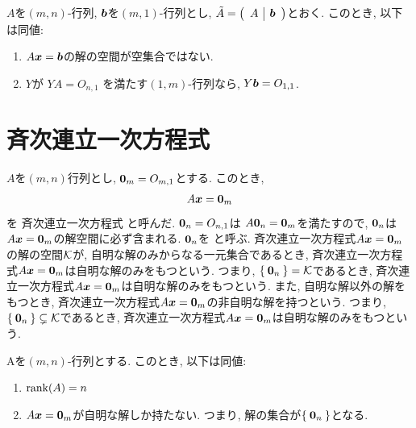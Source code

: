\begin{theorem}
  $A$を$(m,n)$-行列, $\boldsymbol{b}$を$(m,1)$-行列とし,
  $\tilde A=\left(\begin{array}{c|c}A& \boldsymbol{b}\end{array}\right)$とおく.
  このとき, 以下は同値:
  \begin{enumerate}
  \item
    \label{thm:ortho:eq:item:sol}
    $A\boldsymbol{x}=\boldsymbol{b}$の解の空間が空集合ではない.
  \item
    \label{thm:ortho:eq:item:ortho}
    $Y$が
    $YA=O_{n,1}$
    を満たす$(1,m)$-行列なら,
    $Y\boldsymbol{b}=O_{1,1}$.
  \end{enumerate}  
\end{theorem}


\section{斉次連立一次方程式}
$A$を$(m,n)$行列とし,
$\boldsymbol{0}_m=O_{m,1}$とする.
このとき,
\begin{align*}
  A\boldsymbol{x}=\boldsymbol{0}_m
\end{align*}
を
斉次連立一次方程式
と呼んだ.
$\boldsymbol{0}_n=O_{n,1}$は
$A\boldsymbol{0}_n=\boldsymbol{0}_m$を満たすので,
$\boldsymbol{0}_n$は$A\boldsymbol{x}=\boldsymbol{0}_m$の解空間に必ず含まれる.
$\boldsymbol{0}_n$を
%
%
%
%
%
%
%
%
%
と呼ぶ.
斉次連立一次方程式$A\boldsymbol{x}=\boldsymbol{0}_m$の解の空間$\mathcal{K}$が,
自明な解のみからなる一元集合であるとき,
斉次連立一次方程式$A\boldsymbol{x}=\boldsymbol{0}_m$は自明な解のみをもつという.
つまり,
$\Set{\boldsymbol{0}_n}=\mathcal{K}$であるとき,
斉次連立一次方程式$A\boldsymbol{x}=\boldsymbol{0}_m$は自明な解のみをもつという.
また,
自明な解以外の解をもつとき,
斉次連立一次方程式$A\boldsymbol{x}=\boldsymbol{0}_m$の非自明な解を持つという.
つまり,
$\Set{\boldsymbol{0}_n}\subsetneq\mathcal{K}$であるとき,
斉次連立一次方程式$A\boldsymbol{x}=\boldsymbol{0}_m$は自明な解のみをもつという.

\begin{prop}
  Aを$(m,n)$-行列とする.
  このとき, 以下は同値:
  \begin{enumerate}
  \item $\operatorname{rank}(A)=n$
  \item $A\boldsymbol{x}=\boldsymbol{0}_m$が自明な解しか持たない.
    つまり, 解の集合が$\Set{\boldsymbol{0}_n}$となる.
  \end{enumerate}
\end{prop}

